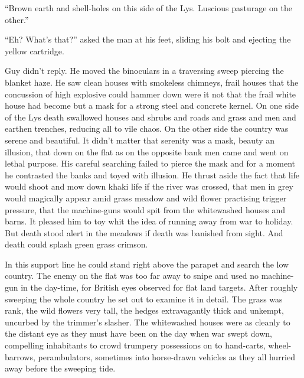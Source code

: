 ``Brown earth and shell-holes on this side of the Lys. Luscious pasturage on the other.''

``Eh? What's that?'' asked the man at his feet, sliding his bolt and ejecting the yellow cartridge.

Guy didn't reply. He moved the binoculars in a traversing sweep piercing the blanket haze. He saw clean houses with smokeless chimneys, frail houses that the concussion of high explosive could hammer down were it not that the frail white house had become but a mask for a strong steel and concrete kernel. On one side of the Lys death swallowed houses and shrubs and roads and grass and men and earthen trenches, reducing all to vile chaos. On the other side the country was serene and beautiful. It didn't matter that serenity was a mask, beauty an illusion, that down on the flat as on the opposite bank men came and went on lethal purpose. His careful searching failed to pierce the mask and for a moment he contrasted the banks and toyed with illusion. He thrust aside the fact that life would shoot and mow down khaki life if the river was crossed, that men in grey would magically appear amid grass meadow and wild flower practising trigger pressure, that the machine-guns would spit from the whitewashed houses and barns. It pleased him to toy whit the idea of running away from war to holiday. But death stood alert in the meadows if death was banished from sight. And death could splash green grass crimson.

In this support line he could stand right above the parapet and search the low country. The enemy on the flat was too far away to snipe and used no machine-gun in the day-time, for British eyes observed for flat land targets. After roughly sweeping the whole country he set out to examine it in detail. The grass was rank, the wild flowers very tall, the hedges extravagantly thick and unkempt, uncurbed by the trimmer's slasher. The whitewashed houses were as cleanly to the distant eye as they must have been on the day when war swept down, compelling inhabitants to crowd trumpery possessions on to hand-carts, wheel-barrows, perambulators, sometimes into horse-drawn vehicles as they all hurried away before the sweeping tide.

